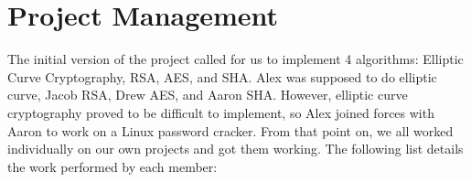\section{Project Management}

The initial version of the project called for us to implement 4 algorithms: Elliptic Curve Cryptography, RSA, AES, and SHA. 
Alex was supposed to do elliptic curve, Jacob RSA, Drew AES, and Aaron SHA.
However, elliptic curve cryptography proved to be difficult to implement, so Alex joined forces with Aaron to work
on a Linux password cracker.
From that point on, we all worked individually on our own projects and got them working.
The following list details the work performed by each member:

